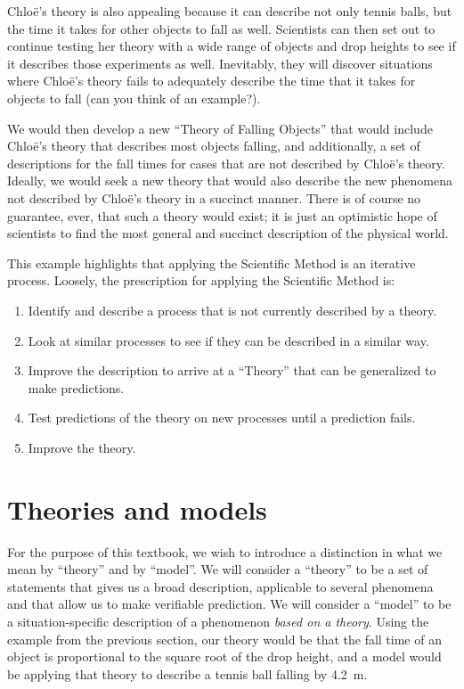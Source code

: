 Chlo\"e's theory is also appealing because it can describe not only tennis balls, but the time it takes for other objects to fall as well. Scientists can then set out to continue testing her theory with a wide range of objects and drop heights to see if it describes those experiments as well. Inevitably, they will discover situations where Chlo\"e's theory fails to adequately describe the time that it takes for objects to fall (can you think of an example?).

We would then develop a new ``Theory of Falling Objects'' that would include Chlo\"e's theory that describes most objects falling, and additionally, a set of descriptions for the fall times for cases that are not described by Chlo\"e's theory. Ideally, we would seek a new theory that would also describe the new phenomena not described by Chlo\"e's theory in a succinct manner. There is of course no guarantee, ever, that such a theory would exist; it is just an optimistic hope of scientists to find the most general and succinct description of the physical world. 

This example highlights that applying the Scientific Method is an iterative process. Loosely, the prescription for applying the Scientific Method is:
\begin{enumerate}
\item Identify and describe a process that is not currently described by a theory.
\item Look at similar processes to see if they can be described in a similar way.
\item Improve the description to arrive at a ``Theory'' that can be generalized to make predictions.
\item Test predictions of the theory on new processes until a prediction fails.
\item Improve the theory.
\end{enumerate}

\section{Theories and models}
For the purpose of this textbook, we wish to introduce a distinction in what we mean by ``theory'' and by ``model''. We will consider a ``theory'' to be a set of statements that gives us a broad description, applicable to several phenomena and that allow us to make verifiable prediction. We will consider a ``model'' to be a situation-specific description of a phenomenon \textit{based on a theory}. Using the example from the previous section, our theory would be that the fall time of an object is proportional to the square root of the drop height, and a model would be applying that theory to describe a tennis ball falling by \SI{4.2}{\meter}.

